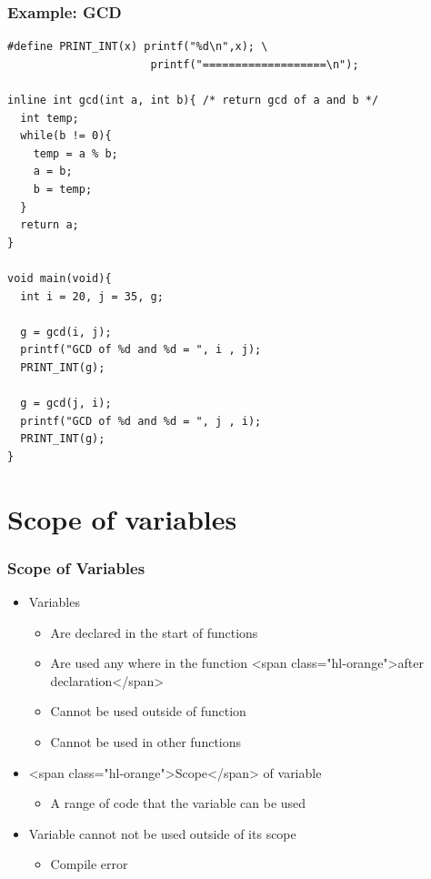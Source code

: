 \documentclass{../c-lecture}
\begin{document}
\begin{frame}
  \frametitle{Example: GCD}
  \begin{verbatim}
#define PRINT_INT(x) printf("%d\n",x); \
                      printf("===================\n");

inline int gcd(int a, int b){ /* return gcd of a and b */
  int temp;
  while(b != 0){
    temp = a % b;
    a = b;
    b = temp;
  }
  return a;
}

void main(void){
  int i = 20, j = 35, g;

  g = gcd(i, j);
  printf("GCD of %d and %d = ", i , j);
  PRINT_INT(g);

  g = gcd(j, i);
  printf("GCD of %d and %d = ", j , i);
  PRINT_INT(g);
}
  \end{verbatim}
\end{frame}

\section{Scope of variables}

\begin{frame}
  \frametitle{Scope of Variables}
  \begin{itemize}
    \item Variables
    \begin{itemize}
      \item Are declared in the start of functions
      \item
        Are used any where in the function
        <span class="hl-orange">after declaration</span>

      \item Cannot be used outside of function
      \item Cannot be used in other functions
    \end{itemize}
    \item <span class="hl-orange">Scope</span> of variable
    \begin{itemize}
      \item A range of code that the variable can be used
    \end{itemize}
    \item Variable cannot not be used outside of its scope
    \begin{itemize}
      \item Compile error
    \end{itemize}
  \end{itemize}
\end{frame}
\end{document}
